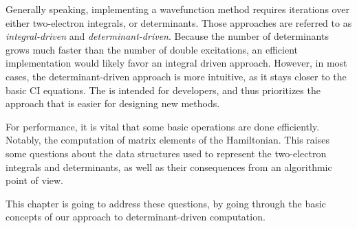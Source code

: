 \documentclass[./thesis.tex]{subfiles}
\begin{document}
\label{chap:DET_DRIVEN}

Generally speaking, implementing a wavefunction method requires iterations over either two-electron integrals, or determinants. Those approaches are referred to as \emph{integral-driven} and \emph{determinant-driven}. Because the number of determinants grows much faster than the number of double excitations, an efficient implementation would likely favor an integral driven approach. However, in most cases, the determinant-driven approach is more intuitive, as it stays closer to the basic CI equations. The \QP is intended for developers, and thus prioritizes the approach that is easier for designing new methods.

For performance, it is vital that some basic operations are done efficiently. Notably, the computation of matrix elements of the Hamiltonian.
This raises some questions about the data structures used to represent the
two-electron integrals and determinants, as well as their consequences from an
algorithmic point of view.

%
This chapter is going to address these questions, by going through the basic concepts of our approach to determinant-driven computation.

%		
%	
%
%
\end{document}
